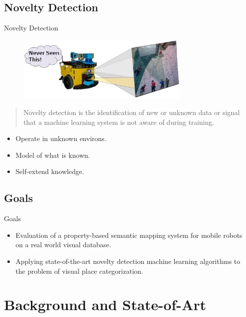 \documentclass[compress]{beamer}
\begin{document}
\subsection{Novelty Detection}
\begin{frame}{Novelty Detection}
\begin{figure}
\includegraphics[width=0.75\textwidth]{figures/novelty_detection.png}
\end{figure}

\begin{quotation}
Novelty detection is the identification of new or unknown data or signal that a machine learning system is not aware of during training\cite{markou2003novelty}.
\end{quotation}
\begin{itemize}
\item Operate in unknown environs.
\item Model of what is known.
\item Self-extend knowledge.
\end{itemize}
\end{frame}

\subsection{Goals}
\begin{frame}{Goals}


\begin{itemize}
\item Evaluation of a property-based semantic mapping system for mobile robots on a real world visual database\cite{pronobis2011exploiting}.
\vfill
\item Applying state-of-the-art novelty detection machine learning algorithms to the problem of visual place categorization.
\end{itemize}
\end{frame}



\section{Background and State-of-Art}
\end{document}
